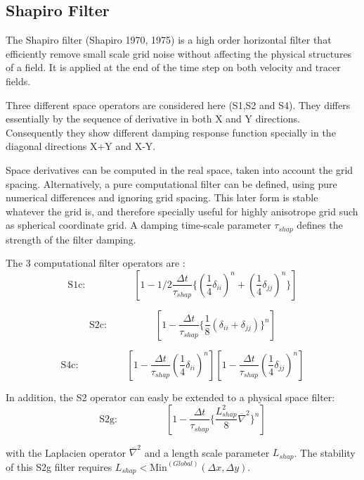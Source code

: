 
\subsection{Shapiro Filter} 

The Shapiro filter (Shapiro 1970, 1975) is a high order horizontal 
filter that efficiently remove small scale grid noise 
without affecting the physical structures of a field. 
It is applied at the end of the time step %
on both velocity and tracer fields.

Three different space operators are considered here (S1,S2 and S4).
They differs essentially by the sequence of derivative in
both X and Y directions. Consequently they show different 
damping response function specially in the diagonal directions 
X+Y and X-Y.

Space derivatives can be computed in the real space, 
taken into account the grid spacing. 
Alternatively, a pure computational filter can be defined,
using pure numerical differences and ignoring 
grid spacing. 
This later form is stable whatever the grid is, and therefore
specially useful for highly anisotrope grid such as spherical 
coordinate grid.
A damping time-scale parameter $\tau_{shap}$ 
defines the strength of the filter damping.

The 3 computational filter operators are :
$$
\mathrm{S1c:}\hspace{2cm}
[1 - 1/2 \frac{\Delta t}{\tau_{shap}}
   \{ (\frac{1}{4}\delta_{ii})^n 
    + (\frac{1}{4}\delta_{jj})^n \} ] 
$$

$$
\mathrm{S2c:}\hspace{2cm}
[1 - \frac{\Delta t}{\tau_{shap}} 
\{ \frac{1}{8} (\delta_{ii} + \delta_{jj}) \}^n]
$$

$$
\mathrm{S4c:}\hspace{2cm}
[1 - \frac{\Delta t}{\tau_{shap}} (\frac{1}{4}\delta_{ii})^n]
[1 - \frac{\Delta t}{\tau_{shap}} (\frac{1}{4}\delta_{jj})^n]
$$

In addition, the S2 operator can easly be extended to 
a physical space filter: 
$$
\mathrm{S2g:}\hspace{2cm}
[1 - \frac{\Delta t}{\tau_{shap}} 
\{ \frac{L_{shap}^2}{8} \overline{\nabla}^2 \}^n]
$$

with the Laplacien operator $\overline{\nabla}^2 $
and a length scale parameter $L_{shap}$.
The stability of this S2g filter requires 
$L_{shap} < \mathrm{Min}^{(Global)}(\Delta x,\Delta y)$.

